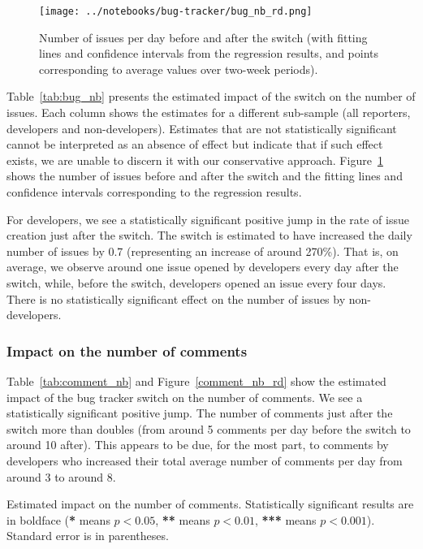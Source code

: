\begin{figure}
	\begin{center}
		\texttt{[image: ../notebooks/bug-tracker/bug\_nb\_rd.png]}
		\caption{
			Number of issues per day before and after the switch (with fitting lines and confidence intervals from the regression results, and points corresponding to average values over two-week periods).
		}
		\label{bug_nb_rd}
	\end{center}
\end{figure}

Table~\ref{tab:bug_nb} presents the estimated impact of the switch on the number of issues.
Each column shows the estimates for a different sub-sample (all reporters, developers and non-developers).
Estimates that are not statistically significant cannot be interpreted as an absence of effect but indicate that if such effect exists, we are unable to discern it with our conservative approach.
Figure~\ref{bug_nb_rd}  shows the number of issues before and after the switch and the fitting lines and confidence intervals corresponding to the regression results. 

For developers, we see a statistically significant positive jump in the rate of issue creation just after the switch.
The switch is estimated to have increased the daily number of issues by 0.7 (representing an increase of around 270\%).
That is, on average, we observe around one issue opened by developers every day after the switch,
while, before the switch, developers opened an issue every four days.
There is no statistically significant effect on the number of issues by non-developers.

\subsubsection{Impact on the number of comments}

Table~\ref{tab:comment_nb} and Figure~\ref{comment_nb_rd} show the estimated impact of the bug tracker switch on the number of comments.
We see a statistically significant positive jump.
The number of comments just after the switch more than doubles (from around 5 comments per day before the switch to around 10 after).
This appears to be due, for the most part, to comments by developers who increased their total average number of comments per day from around 3 to around 8.

\begin{table}
	\begin{center}
		
		\caption{
			Estimated impact on the number of comments.
			Statistically significant results are in boldface (\textbf{*} means $p<0.05$, \textbf{**} means $p<0.01$, \textbf{***} means $p<0.001$).
			Standard error is in parentheses.
		}
		\label{tab:comment_nb}
	\end{center}
\end{table}

